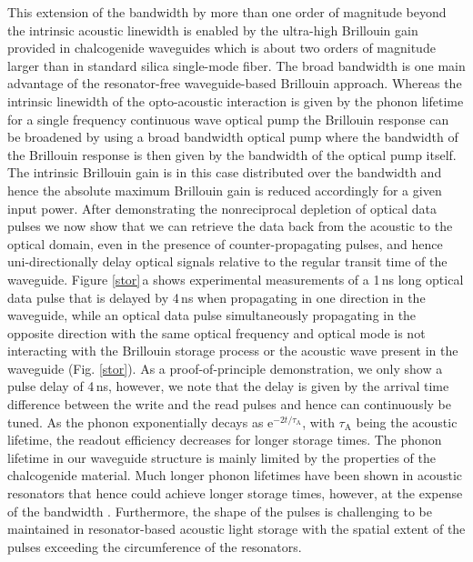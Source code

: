 \documentclass[superscriptaddress, nofootinbib, twocolumn, amsmath,amssymb, aps, pra, notitlepage, longbibliography]{revtex4-1}
\begin{document}
%
This extension of the bandwidth by more than one order of magnitude beyond the intrinsic acoustic linewidth is enabled by the ultra-high Brillouin gain provided in chalcogenide waveguides which is about two orders of magnitude larger than in standard silica single-mode fiber. The broad bandwidth is one main advantage of the resonator-free waveguide-based Brillouin approach. Whereas the intrinsic linewidth of the opto-acoustic interaction is given by the phonon lifetime for a single frequency continuous wave optical pump the Brillouin response can be broadened by using a broad bandwidth optical pump where the bandwidth of the Brillouin response is then given by the bandwidth of the optical pump itself. The intrinsic Brillouin gain is in this case distributed over the bandwidth and hence the absolute maximum Brillouin gain is reduced accordingly for a given input power. \newline
After demonstrating the nonreciprocal depletion of optical data pulses we now show that we can retrieve the data back from the acoustic to the optical domain, even in the presence of counter-propagating pulses, and hence uni-directionally delay optical signals relative to the regular transit time of the waveguide. Figure \ref{stor}\,a shows experimental measurements of a 1\,ns long optical data pulse that is delayed by 4\,ns when propagating in one direction in the waveguide, while an optical data pulse simultaneously propagating in the opposite direction with the same optical frequency and optical mode is not interacting with the Brillouin storage process or the acoustic wave present in the waveguide (Fig. \ref{stor}). As a proof-of-principle demonstration, we only show a pulse delay of 4\,ns, however, we note that the delay is given by the arrival time difference between the write and the read pulses and hence can continuously be tuned. As the phonon exponentially decays as \(\mathrm{e}^{-2t/\tau_\mathrm{A}}\), with \(\tau_\mathrm{A}\) being the acoustic lifetime, the readout efficiency decreases for longer storage times. The phonon lifetime in our waveguide structure is mainly limited by the properties of the chalcogenide material. Much longer phonon lifetimes have been shown in acoustic resonators that hence could achieve longer storage times, however, at the expense of the bandwidth \cite{Fiore2011a,Fiore2013,Dong2015}. Furthermore, the shape of the pulses is challenging to be maintained in resonator-based acoustic light storage with the spatial extent of the pulses exceeding the circumference of the resonators. \newline
\end{document}
